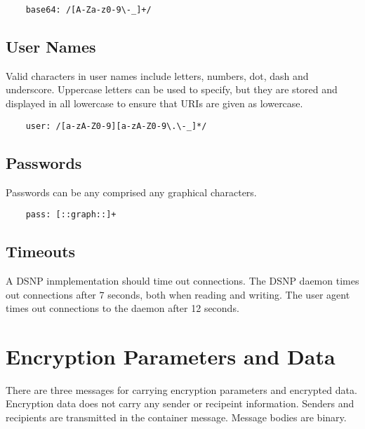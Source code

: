 \documentclass[letterpaper,11pt,oneside]{article}
\begin{document}
\vspace{10pt}
\begin{verbatim}
    base64: /[A-Za-z0-9\-_]+/
\end{verbatim}
\vspace{10pt}

\subsection{User Names}

Valid characters in user names include letters, numbers, dot, dash and
underscore. Uppercase letters can be used to specify, but they are stored and
displayed in all lowercase to ensure that URIs are given as lowercase.

\vspace{10pt}
\begin{verbatim}
    user: /[a-zA-Z0-9][a-zA-Z0-9\.\-_]*/
\end{verbatim}
\vspace{10pt}

\subsection{Passwords}

Passwords can be any comprised any graphical characters.

\vspace{10pt}
\begin{verbatim}
    pass: [::graph::]+
\end{verbatim}
\vspace{10pt}

\subsection{Timeouts}

A DSNP inmplementation should time out connections. The DSNP daemon times out
connections after 7 seconds, both when reading and writing. The user agent
times out connections to the daemon after 12 seconds.

\section{Encryption Parameters and Data}

There are three messages for carrying encryption parameters and encrypted data.
Encryption data does not carry any sender or recipeint information. Senders and
recipients are transmitted in the container message. Message bodies are binary.
\end{document}
